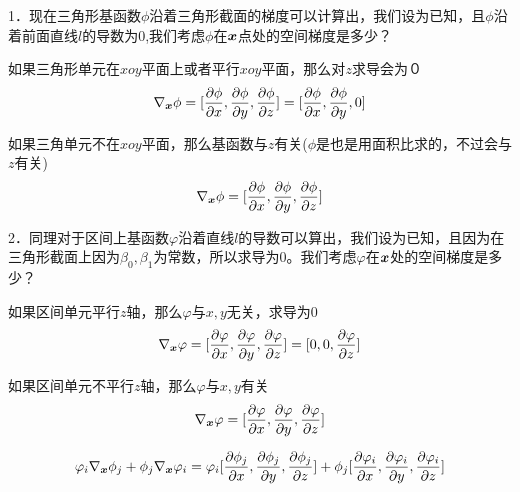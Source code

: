 \documentclass{article}
\begin{document}
1．现在三角形基函数$\phi$沿着三角形截面的梯度可以计算出，我们设为已知，且$\phi$沿着前面直线$l$的导数为$0$,我们考虑$\phi$在$\boldsymbol x$点处的空间梯度是多少？

如果三角形单元在$xoy$平面上或者平行$xoy$平面，那么对$z$求导会为$０$
$$\nabla_{\boldsymbol x} \phi =[\frac{\partial \phi}{\partial x},\frac{\partial \phi}{\partial y},\frac{\partial \phi}{\partial z}]=[\frac{\partial \phi}{\partial x},\frac{\partial \phi}{\partial y},0]$$


如果三角单元不在$xoy$平面，那么基函数与$z$有关($\phi$是也是用面积比求的，不过会与$z$有关)
$$\nabla_{\boldsymbol x} \phi =[\frac{\partial \phi}{\partial x},\frac{\partial \phi}{\partial y},\frac{\partial \phi}{\partial z}]$$

2．同理对于区间上基函数$\varphi$沿着直线$l$的导数可以算出，我们设为已知，且因为在三角形截面上因为$\beta_0,\beta_1$为常数，所以求导为$0$。我们考虑$\varphi$在$\boldsymbol x$处的空间梯度是多少？


如果区间单元平行$z$轴，那么$\varphi$与$x,y$无关，求导为$0$
$$\nabla_{\boldsymbol x} \varphi =[\frac{\partial \varphi}{\partial x},\frac{\partial \varphi}{\partial y},\frac{\partial \varphi}{\partial z}]=[0,0,\frac{\partial \varphi}{\partial z}]$$

如果区间单元不平行$z$轴，那么$\varphi$与$x,y$有关
$$\nabla_{\boldsymbol x} \varphi =[\frac{\partial \varphi}{\partial x},\frac{\partial \varphi}{\partial y},\frac{\partial \varphi}{\partial z}]$$



$$\varphi_i \nabla_{\boldsymbol x}\phi_j + \phi_j\nabla_{\boldsymbol x}\varphi_i=\varphi_i[\frac{\partial \phi_j}{\partial x},\frac{\partial \phi_j}{\partial y},\frac{\partial \phi_j}{\partial z}]+\phi_j[\frac{\partial \varphi_i}{\partial x},\frac{\partial \varphi_i}{\partial y},\frac{\partial \varphi_i}{\partial z}]$$


\cite{sheng2008}


\end{document}
